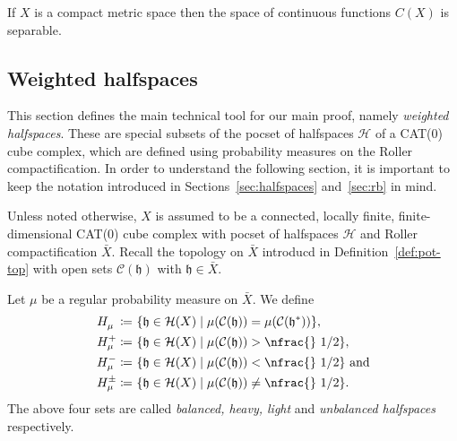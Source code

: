 \begin{lemma}
  \label{lem:continuous-separable}
  If \(X\) is a compact metric space then the space of continuous functions \(C(X)\) is separable.
\end{lemma}

\subsection{Weighted halfspaces}
\label{sec:weight}

This section defines the main technical tool for our main proof, namely \emph{weighted halfspaces}. These are special subsets of the pocset of halfspaces \(\mathcal{H}\) of a CAT(0) cube complex, which are defined using probability measures on the Roller compactification. In order to understand the following section, it is important to keep the notation introduced in Sections~\ref{sec:halfspaces} and~\ref{sec:rb} in mind.

Unless noted otherwise, \(X\) is assumed to be a connected, locally finite, finite-dimensio\-nal CAT(0) cube complex with pocset of halfspaces \(\mathcal{H}\) and Roller compactification \(\bar X\). Recall the topology on \(\bar X\) introducd in Definition~\ref{def:pot-top} with open sets \(\mathcal{C}(\mathfrak{h})\) with \(\mathfrak{h} \in \bar X\).

\begin{defin}
  \label{defin:weight}
  Let \(\mu\) be a regular probability measure on \(\bar X\). We define
  \begin{align*}
    H_\mu^{\phantom{+}} \coloneqq &\ \{\mathfrak{h} \in \mathcal{H}(X) \mid \mu(\mathcal{C}(\mathfrak{h})) = \mu(\mathcal{C}(\mathfrak{h}^\ast))\},\\
    H_\mu^+ \coloneqq &\ \{\mathfrak{h} \in \mathcal{H}(X) \mid \mu(\mathcal{C}(\mathfrak{h})) > \text{\nfrac{} 1/2} \},\\
    H_\mu^- \coloneqq &\ \{\mathfrak{h} \in \mathcal{H}(X) \mid \mu(\mathcal{C}(\mathfrak{h})) < \text{\nfrac{} 1/2}\} \text{ and}\\
    H_\mu^\pm \coloneqq &\ \{\mathfrak{h} \in \mathcal{H}(X) \mid \mu(\mathcal{C}(\mathfrak{h})) \neq \text{\nfrac{} 1/2}\}.
  \end{align*} 
  The above four sets are called \emph{balanced, heavy, light} and \emph{unbalanced halfspaces} respectively.
\end{defin}

